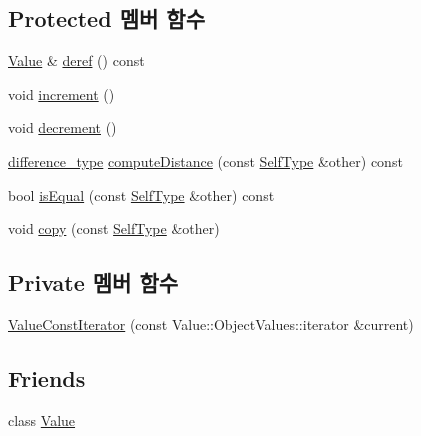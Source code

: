 \subsection*{Protected 멤버 함수}
\begin{DoxyCompactItemize}
\item 
\hyperlink{class_json_1_1_value}{Value} \& \hyperlink{class_json_1_1_value_iterator_base_aa5b75c9514a30ba2ea3c9a35c165c18e}{deref} () const
\item 
void \hyperlink{class_json_1_1_value_iterator_base_afe58f9534e1fd2033419fd9fe244551e}{increment} ()
\item 
void \hyperlink{class_json_1_1_value_iterator_base_affc8cf5ff54a9f432cc693362c153fa6}{decrement} ()
\item 
\hyperlink{class_json_1_1_value_iterator_base_a4e44bf8cbd17ec8d6e2c185904a15ebd}{difference\+\_\+type} \hyperlink{class_json_1_1_value_iterator_base_af11473c9e20d07782e42b52a2f9e4540}{compute\+Distance} (const \hyperlink{class_json_1_1_value_iterator_base_a9d2a940d03ea06d20d972f41a89149ee}{Self\+Type} \&other) const
\item 
bool \hyperlink{class_json_1_1_value_iterator_base_a010b5ad3f3337ae3732e5d7e16ca5e25}{is\+Equal} (const \hyperlink{class_json_1_1_value_iterator_base_a9d2a940d03ea06d20d972f41a89149ee}{Self\+Type} \&other) const
\item 
void \hyperlink{class_json_1_1_value_iterator_base_a496e6aba44808433ec5858c178be5719}{copy} (const \hyperlink{class_json_1_1_value_iterator_base_a9d2a940d03ea06d20d972f41a89149ee}{Self\+Type} \&other)
\end{DoxyCompactItemize}
\subsection*{Private 멤버 함수}
\begin{DoxyCompactItemize}
\item 
\hyperlink{class_json_1_1_value_const_iterator_aa0a87edf5f1097f91dca5f2a389c4abd}{Value\+Const\+Iterator} (const Value\+::\+Object\+Values\+::iterator \&current)
\end{DoxyCompactItemize}
\subsection*{Friends}
\begin{DoxyCompactItemize}
\item 
class \hyperlink{class_json_1_1_value_const_iterator_aeceedf6e1a7d48a588516ce2b1983d6f}{Value}
\end{DoxyCompactItemize}


